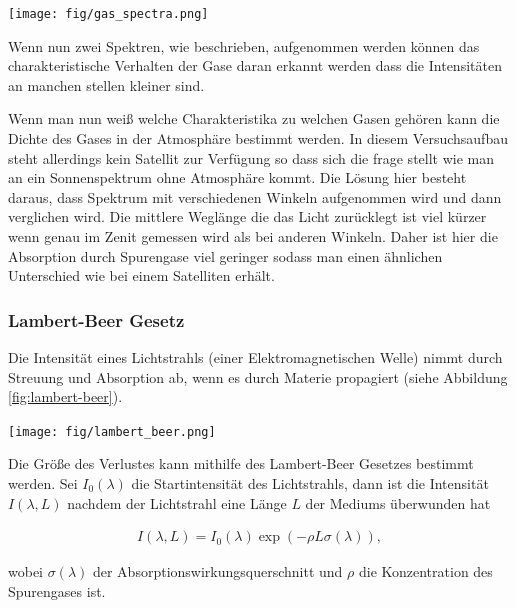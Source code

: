 \documentclass[12pt, a4paper, bibliography=totoc]{scrartcl}
\begin{document}
\begin{multicols}{2}
\begin{center}
    \texttt{[image: fig/gas\_spectra.png]}
    \label{fig:gas_spectra}
\end{center}

Wenn nun zwei Spektren, wie beschrieben, aufgenommen werden 
können das charakteristische Verhalten der Gase daran erkannt werden dass die Intensitäten an manchen stellen kleiner sind.

Wenn man nun weiß welche Charakteristika zu welchen Gasen gehören kann die Dichte des Gases in der Atmosphäre bestimmt werden.
In diesem Versuchsaufbau steht allerdings kein Satellit zur Verfügung so dass sich die frage stellt wie man an ein Sonnenspektrum ohne Atmosphäre kommt.
Die Lösung hier besteht daraus, dass Spektrum mit verschiedenen Winkeln aufgenommen wird und dann verglichen wird.
Die mittlere Weglänge die das Licht zurücklegt ist viel kürzer wenn genau im Zenit gemessen wird als bei anderen Winkeln.
Daher ist hier die Absorption durch Spurengase viel geringer sodass man einen ähnlichen Unterschied wie bei einem Satelliten erhält.

\subsubsection{Lambert-Beer Gesetz}\label{sssec:Lamb-Beer_law}

Die Intensität eines Lichtstrahls (einer Elektromagnetischen Welle) nimmt durch Streuung und Absorption ab, wenn es durch Materie propagiert (siehe Abbildung \ref{fig:lambert-beer}).

\begin{center}
    \texttt{[image: fig/lambert\_beer.png]}
	\label{fig:lambert-beer}
\end{center}

Die Größe des Verlustes kann mithilfe des Lambert-Beer Gesetzes bestimmt werden.
Sei $I_0 (\lambda)$ die Startintensität des Lichtstrahls, dann ist die Intensität $I(\lambda, L)$ nachdem der Lichtstrahl eine Länge $L$ der Mediums überwunden hat
    
\begin{align}
    I(\lambda, L) = I_0 (\lambda) \exp \left( - \rho L \sigma (\lambda)\right) ,\label{eq:lambert_beer_law}
\end{align}

wobei $\sigma (\lambda)$ der Absorptionswirkungsquerschnitt und $\rho$ die Konzentration des Spurengases ist.


\end{multicols}
\end{document}
